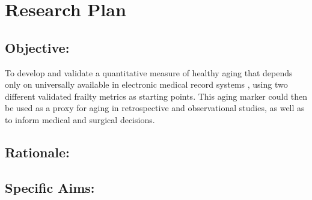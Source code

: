 \section{Research Plan }\label{research-plan}


\subsection{Objective:}\label{objective}
  
To develop and validate a quantitative measure of healthy aging that depends only on universally available in electronic medical record systems ,
using two different validated frailty metrics as starting points. This
aging marker could then be used as a proxy for aging in retrospective
and observational studies, as well as to inform medical and surgical
decisions.


\subsection{Rationale:}\label{rationale}

\subsection{Specific Aims:}\label{specific-aims}

